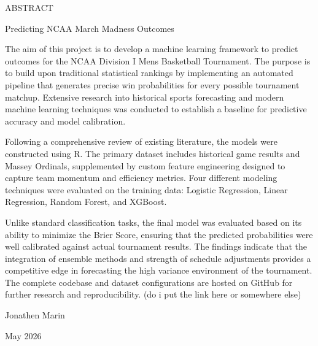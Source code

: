 \documentclass[12pt,leqno]{article}\usepackage[pdftex]{graphicx}\usepackage[usenames,dvipsnames]{xcolor}
\theoremstyle{remark}
\begin{document}
\begin{center}
ABSTRACT
\end{center}

\begin{center}
Predicting NCAA March Madness Outcomes
\end{center}

\doublespacing
The aim of this project is to develop a machine learning framework to predict outcomes for the NCAA Division I Mens Basketball Tournament. The purpose is to build upon traditional statistical rankings by implementing an automated pipeline that generates precise win probabilities for every possible tournament matchup. Extensive research into historical sports forecasting and modern machine learning techniques was conducted to establish a baseline for predictive accuracy and model calibration.

Following a comprehensive review of existing literature, the models were constructed using R. The primary dataset includes historical game results and Massey Ordinals, supplemented by custom feature engineering designed to capture team momentum and efficiency metrics. Four different modeling techniques were evaluated on the training data: Logistic Regression, Linear Regression, Random Forest, and XGBoost.
 
Unlike standard classification tasks, the final model was evaluated based on its ability to minimize the Brier Score, ensuring that the predicted probabilities were well calibrated against actual tournament results. The findings indicate that the integration of ensemble methods and strength of schedule adjustments provides a competitive edge in forecasting the high variance environment of the tournament. The complete codebase and dataset configurations are hosted on GitHub for further research and reproducibility. (do i put the link here or somewhere else)


\singlespacing
\vskip 0.3in
\noindent Jonathen Marin%

\noindent May 2026 %
\thispagestyle{empty}
\newpage
\end{document}

